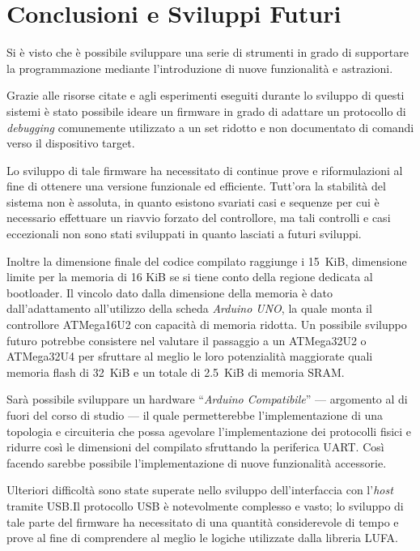 \chapter*{Conclusioni e Sviluppi Futuri}

Si è visto che è possibile sviluppare una serie di strumenti in grado di supportare la programmazione mediante l'introduzione di nuove funzionalità e astrazioni.

Grazie alle risorse citate e agli esperimenti eseguiti durante lo sviluppo di questi sistemi è stato possibile ideare un firmware in grado di adattare un protocollo di \textit{debugging} comunemente utilizzato a un set ridotto e non documentato di comandi verso il dispositivo target.

Lo sviluppo di tale firmware ha necessitato di continue prove e riformulazioni al fine di ottenere una versione funzionale ed efficiente. Tutt'ora la stabilità del sistema non è assoluta, in quanto esistono svariati casi e sequenze per cui è necessario effettuare un riavvio forzato del controllore, ma tali controlli e casi eccezionali non sono stati sviluppati in quanto lasciati a futuri sviluppi.

Inoltre la dimensione finale del codice compilato raggiunge i \SI{15}{KiB}, dimensione limite per la memoria di 16 KiB se si tiene conto della regione dedicata al bootloader. Il vincolo dato dalla dimensione della memoria è dato dall'adattamento all'utilizzo della scheda \textit{Arduino UNO}, la quale monta il controllore ATMega16U2 con capacità di memoria ridotta. Un possibile sviluppo futuro potrebbe consistere nel valutare il passaggio a un ATMega32U2 o ATMega32U4 per sfruttare al meglio le loro potenzialità maggiorate quali memoria flash di \SI{32}{KiB} e un totale di \SI{2.5}{KiB} di memoria SRAM\cite{avr:m16u4}.

Sarà possibile sviluppare un hardware ``\textit{Arduino Compatibile}'' --- argomento al di fuori del corso di studio --- il quale permetterebbe l'implementazione di una topologia e circuiteria che possa agevolare l'implementazione dei protocolli fisici e ridurre così le dimensioni del compilato sfruttando la periferica UART.\@
Così facendo sarebbe possibile l'implementazione di nuove funzionalità accessorie.

Ulteriori difficoltà sono state superate nello sviluppo dell'interfaccia con l'\textit{host} tramite USB.\@ Il protocollo USB è notevolmente complesso e vasto; lo sviluppo di tale parte del firmware ha necessitato di una quantità considerevole di tempo e prove al fine di comprendere al meglio le logiche utilizzate dalla libreria LUFA.\@

